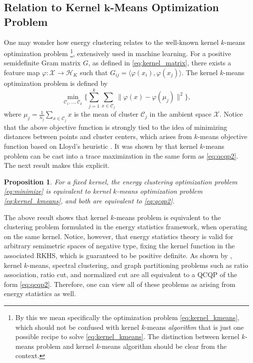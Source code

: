 \documentclass{article}
\newtheorem{proposition}[theorem]{Proposition}
\newcommand\kk{K}
\newcommand\HH{\mathcal{H}}
\newcommand\C{{\mathcal{C}}}
\begin{document}
\subsection{Relation to Kernel $\bm{k}$-Means Optimization Problem}
One may wonder how energy clustering 
relates to the well-known kernel $k$-means optimization problem%
\footnote{By this we mean specifically 
the optimization problem \eqref{eq:kernel_kmeans}, which should not be 
confused with kernel $k$-means \emph{algorithm} that is 
just one possible recipe 
to solve \eqref{eq:kernel_kmeans}. The distinction between kernel $k$-means
problem and kernel $k$-means algorithm should be clear from 
the context.}, 
extensively used in machine learning.
For a positive semidefinite Gram matrix $G$, as defined in
\eqref{eq:kernel_matrix},
there exists a feature map
$\varphi: \mathcal{X} \to \HH_\kk$ such that
$G_{ij} = \langle \varphi(x_i), \varphi(x_j) \rangle$. 
The kernel $k$-means optimization
problem
is defined by
\begin{equation}
\label{eq:kernel_kmeans}
\min_{\C_1,\dotsc,\C_k}\bigg\{ 
\sum_{j=1}^k
\sum_{x \in \C_j} \| \varphi(x) - \varphi(\mu_j) \|^2
\bigg\} ,
\end{equation}
where $\mu_j = \tfrac{1}{n_j} \sum_{x \in \C_j} x$ is the  mean of cluster
$\C_j$ in the ambient space $\mathcal{X}$. 
Notice that the above objective function
is strongly tied to the idea of minimizing distances between points
and cluster centers, which arises from $k$-means objective function based
on Lloyd's heuristic \citep{Lloyd}.
It was shown by \citet{Dhillon2,Dhillon}
that kernel $k$-means problem 
can be cast into a trace maximization in the same form as 
\eqref{eq:qcqp2}. The next result makes this explicit.

\begin{proposition}
\label{th:kernel_kmeans}
For a fixed kernel,
the energy clustering optimization problem
\eqref{eq:minimize} 
is equivalent to kernel $k$-means optimization problem
\eqref{eq:kernel_kmeans}, and both are equivalent to \eqref{eq:qcqp2}.
\end{proposition}

The above result shows that 
kernel $k$-means problem is equivalent to the clustering problem
formulated in the energy statistics framework, when operating on the same
kernel. Notice, however, that 
energy statistics theory is valid for arbitrary semimetric spaces of
negative type, fixing the kernel function in the associated RKHS, which
is guaranteed to be positive definite.
As shown by \citet{Dhillon2,Dhillon}, kernel $k$-means, spectral clustering,
and graph partitioning problems such as ratio association, ratio cut, and
normalized cut are all equivalent to a QCQP of the form \eqref{eq:qcqp2}.
Therefore, one can view all of 
these problems as arising from energy statistics as well.
\end{document}
